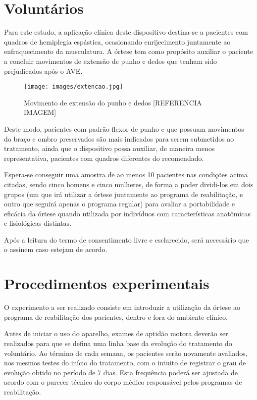 \documentclass[rascunho,xindy]{fei}
\begin{document}
\section{Voluntários}

Para este estudo, a aplicação clínica deste dispositivo destina-se a pacientes com quadros de hemiplegia espástica, ocasionando enrijecimento juntamente ao enfraquecimento da musculatura. 
A órtese tem como propósito auxiliar o paciente a concluir movimentos de extensão de punho e dedos que tenham sido prejudicados após o AVE. 

\begin{figure}[!htb]
\centering
\texttt{[image: images/extencao.jpg]}
\caption{Movimento de extensão do punho e dedos [REFERENCIA IMAGEM]}
\label{extensao}
\end{figure}

Deste modo, pacientes com padrão flexor de punho e que possuam movimentos do braço e ombro preservados são mais indicados para serem submetidos ao tratamento, ainda que o dispositivo possa auxiliar, de maneira menos representativa, pacientes com quadros diferentes do recomendado.

Espera-se conseguir uma amostra de ao menos 10 pacientes nas condições acima citadas, sendo cinco homens e cinco mulheres, de forma a poder dividi-los em dois grupos (um que irá utilizar a órtese juntamente ao programa de reabilitação, e outro que seguirá apenas o programa regular) para avaliar a portabilidade e eficácia da órtese quando utilizada por indivíduos com características anatômicas e fisiológicas distintas.

Após a leitura do termo de consentimento livre e esclarecido, será necessário que o assinem caso estejam de acordo.

\section{Procedimentos experimentais}

O experimento a ser realizado consiste em introduzir a utilização da órtese ao programa de reabilitação dos pacientes, dentro e fora do ambiente clínico.

Antes de iniciar o uso do aparelho, exames de aptidão motora deverão ser realizados para que se defina uma linha base da evolução do tratamento do voluntário. Ao término de cada semana, os pacientes serão novamente avaliados, nos mesmos testes do início do tratamento, com o intuito de registrar o grau de evolução obtido no período de 7 dias. Esta frequência poderá ser ajustada de acordo com o parecer técnico do corpo médico responsável pelos programas de reabilitação.
\end{document}
